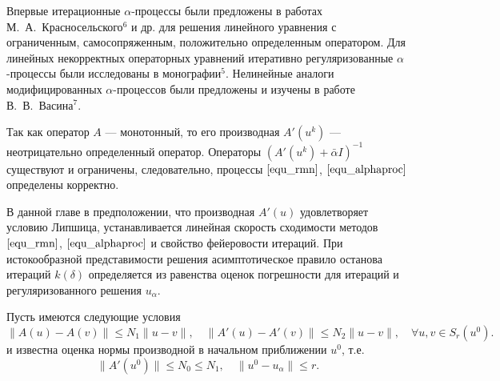 \documentclass[%
autoref,     %
href,        %
facsimile,   %
colorlinks,  %
]{disser}
\begin{document}
Впервые итерационные $\alpha$-процессы были предложены в работах М.~А.~Крас\-носельского$^6$ и др. для решения линейного уравнения с ограниченным, самосопряженным, положительно определенным оператором. Для линейных некорректных операторных уравнений итеративно регуляризованные $\alpha$-процессы были исследованы в монографии$^5$. Нелинейные аналоги модифицированных $\alpha$-про\-цессов были предложены и изучены в работе В.~В.~Васина$^7$.

{\scriptsize
	\let\thefootnote\relax\let\thefootnote\relax{}
	\let\thefootnote\relax\let\thefootnote\relax{}
}

Так как оператор $A$ --- монотонный, то его производная $A'(u^k)$ --- неотрицательно определенный оператор. Операторы $(A'(u^k)+\bar\alpha I)^{-1}$ существуют и ограничены, следовательно, процессы $\eqref{equ_rmn}$, $\eqref{equ_alphaproc}$ определены корректно.

В данной главе в предположении, что производная $A'(u)$ удовлетворяет условию Липшица, устанавливается линейная скорость сходимости методов $\eqref{equ_rmn}$,  $\eqref{equ_alphaproc}$ и свойство фейеровости итераций. При истокообразной представимости решения асимптотическое правило останова итераций $k(\delta)$ определяется из равенства оценок погрешности для итераций и регуляризованного решения $u_\alpha$.

Пусть имеются следующие условия
\begin{equation}\label{cond1.1}
\|A(u)-A(v)\|\leqslant N_1\|u-v\|, \quad
\|A'(u)-A'(v)\|\leqslant N_2\|u-v\|, \quad \forall u, v \in S_r(u^0).
\end{equation}
и известна оценка нормы производной в начальном приближении $u^0$, т.е.
\begin{equation}\label{cond1.3}
\|A'(u^0)\| \leqslant N_0\leqslant N_1, \quad \|u^0-u_\alpha\| \leqslant r.
\end{equation}
\end{document}
